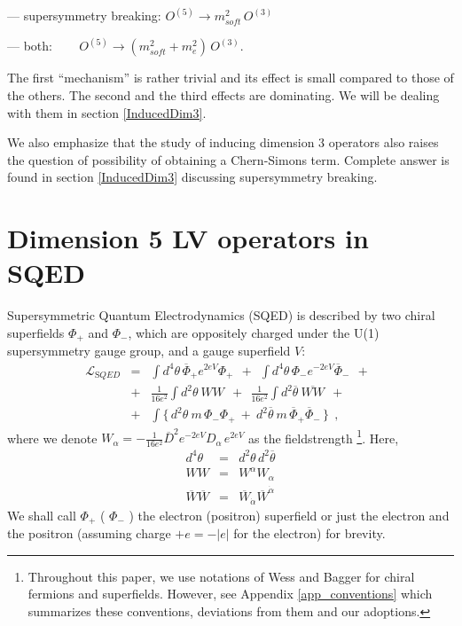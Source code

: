 \documentclass[a4paper,12pt]{article}
\begin{document}
	--- supersymmetry breaking:
		$ O^{(5)} \to m_{soft}^2\, O^{(3)} $

	--- both: \qquad\qquad~~~
		$ O^{(5)} \to (m_{soft}^2 + m_e^2)\, O^{(3)} $.

	The first ``mechanism'' is rather trivial and its effect
	is small compared to those of the others.
	The second and the third effects are dominating. 
	We will be dealing with them in section \ref{InducedDim3}.

	We also emphasize that the study of inducing dimension
	3 operators also raises the question of possibility of
	obtaining a Chern-Simons term. 
	Complete answer is found in section \ref{InducedDim3}
	discussing supersymmetry breaking.


\section{Dimension 5 LV operators in SQED}
\label{Dim5LV}
	Supersymmetric Quantum Electrodynamics (SQED) is described
	by two chiral superfields $ \Phi_+ $ and $ \Phi_- $, which
	are oppositely charged under the U(1) supersymmetry gauge
	group, and a gauge superfield $ V $: 
\begin{eqnarray}
\nonumber
	\mathcal{L}_{\mathrm SQED} & =
&	
	\int d^4\theta\, 
	   \overline{\Phi}_+ e^{2eV} \Phi_+ ~~+~~
	\int d^4\theta\,
	   \Phi_- e^{-2eV} \overline{\Phi}_- ~~+~~ \\
\label{SQED}
& 
	+ &
	\frac{1}{16e^2} \int d^2\theta~
	WW ~~+~~
	\frac{1}{16e^2} \int d^2\overline{\theta}~
	\overline{WW} ~~+~~ \\
\nonumber
& 
	+ &
	\int \{\, d^2\theta~ m\, \Phi_-\Phi_+ ~+~
	         d^2\overline{\theta}~ 
		 m\, \overline{\Phi}_+\overline{\Phi}_-\,
             \}~~,
\end{eqnarray}
	where we denote 
  $ W_\alpha = - \frac{1}{16e^2} \overline{D}^2 
	e^{-2eV} D_\alpha\, e^{2eV} $ 
	as the fieldstrength
\footnote{
	Throughout this paper, we use notations of Wess and Bagger
\cite{Wess:1992cp}
	for chiral fermions and superfields.
	However, see Appendix 
\ref{app_conventions}	
	which summarizes these conventions, deviations from
	them and our adoptions.
	}.
	Here, 
\begin{eqnarray*}
	d^4 \theta & = & d^2\theta\, d^2\overline{\theta} \\
	W W & = & W^\alpha W_\alpha \\
        \overline{W}\overline{W} & = & 
		\overline{W}_{\dot\alpha} \overline{W}^{\dot\alpha}
\end{eqnarray*}
	We shall call $ \Phi_+ $ ( $ \Phi_- $ ) the electron (positron) 
	superfield or just the electron and the positron (assuming charge
	$ + e = - | e | $ for the electron) for brevity.
	
\end{document}
